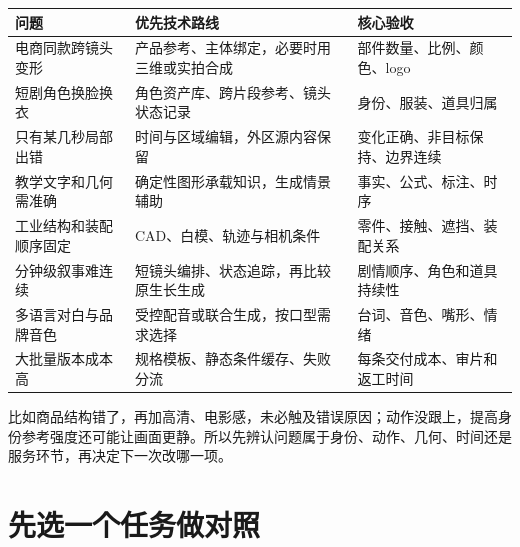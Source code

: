 {\def\LTcaptype{table} %
\small\setlength{\tabcolsep}{3pt}\renewcommand{\arraystretch}{1.18}
\begin{longtable}[]{@{}
  >{\raggedright\arraybackslash}p{}
  >{\raggedright\arraybackslash}p{}
  >{\raggedright\arraybackslash}p{}@{}}
\toprule\noalign{}
\begin{minipage}[b]{\linewidth}\raggedright
问题
\end{minipage} & \begin{minipage}[b]{\linewidth}\raggedright
优先技术路线
\end{minipage} & \begin{minipage}[b]{\linewidth}\raggedright
核心验收
\end{minipage} \\
\midrule\noalign{}
\endhead
\bottomrule\noalign{}
\endlastfoot
电商同款跨镜头变形 & 产品参考、主体绑定，必要时用三维或实拍合成 & 部件数量、比例、颜色、logo \\
短剧角色换脸换衣 & 角色资产库、跨片段参考、镜头状态记录 & 身份、服装、道具归属 \\
只有某几秒局部出错 & 时间与区域编辑，外区源内容保留 & 变化正确、非目标保持、边界连续 \\
教学文字和几何需准确 & 确定性图形承载知识，生成情景辅助 & 事实、公式、标注、时序 \\
工业结构和装配顺序固定 & CAD、白模、轨迹与相机条件 & 零件、接触、遮挡、装配关系 \\
分钟级叙事难连续 & 短镜头编排、状态追踪，再比较原生长生成 & 剧情顺序、角色和道具持续性 \\
多语言对白与品牌音色 & 受控配音或联合生成，按口型需求选择 & 台词、音色、嘴形、情绪 \\
大批量版本成本高 & 规格模板、静态条件缓存、失败分流 & 每条交付成本、审片和返工时间 \\
\end{longtable}
}

比如商品结构错了，再加高清、电影感，未必触及错误原因；动作没跟上，提高身份参考强度还可能让画面更静。所以先辨认问题属于身份、动作、几何、时间还是服务环节，再决定下一次改哪一项。

\section{先选一个任务做对照}\label{seedance-m14-ux5148ux9009ux4e00ux4e2aux4efbux52a1ux505aux5bf9ux7167}

